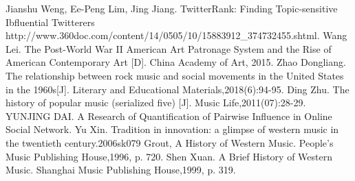 \documentclass[12pt]{article}  %
\begin{document}
\clearpage
\begin{thebibliography}{99}
	 Jianshu Weng, Ee-Peng Lim, Jing Jiang. TwitterRank: Finding Topic-sensitive Ibfluential Twitterers
	 http://www.360doc.com/content/14/0505/10/15883912\_374732455.shtml.
	 Wang Lei. The Post-World War II American Art Patronage System and the Rise of American Contemporary Art [D]. China Academy of Art, 2015.
	  Zhao Dongliang. The relationship between rock music and social movements in the United States in the 1960s[J]. Literary and Educational Materials,2018(6):94-95.
	Ding Zhu. The history of popular music (serialized five) [J]. Music Life,2011(07):28-29.
	YUNJING DAI. A Research of Quantification of Pairwise Influence in Online Social Network. 
	Yu Xin. Tradition in innovation: a glimpse of western music in the twentieth century.2006sk079
	Grout, A History of Western Music. People's Music Publishing House,1996, p. 720.
	 Shen Xuan. A Brief History of Western Music. Shanghai Music Publishing House,1999, p. 319.
\end{thebibliography}
\end{document}
